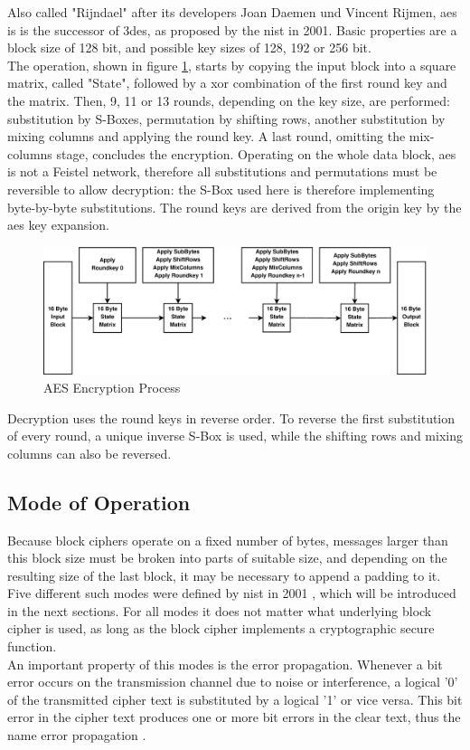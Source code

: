 Also called "Rijndael" after its developers Joan Daemen und Vincent Rijmen, \gls{aes} is is the successor of \gls{3des}, as
proposed by the \gls{nist} in 2001. Basic properties are a block size of 128 bit, and possible key sizes
of 128, 192 or 256 bit.
\\
The operation, shown in figure \ref{fig:aesEnc}, starts by copying the input block into a square matrix, called "State",
followed by a \gls{xor} combination of the first round 
key and the matrix. Then, 9, 11 or 13 rounds, depending on the key size, are performed: substitution by S-Boxes, permutation by shifting rows, 
another substitution by mixing columns and applying the round key. A last round, omitting the mix-columns stage, concludes the encryption.
Operating on the whole data block, \gls{aes} is not a Feistel network, therefore all substitutions and permutations must be reversible to allow decryption: 
the S-Box used here is therefore implementing byte-by-byte substitutions. The round keys are derived from the origin key by the \gls{aes} key expansion.
\begin{figure}
    \centering
    \includegraphics[width=1\textwidth]{figures/aesEnc.eps}
    \caption{AES Encryption Process}
    \label{fig:aesEnc}
\end{figure}
Decryption uses the round keys in reverse order. To reverse the first substitution of every round, a unique inverse S-Box is used, while the shifting rows
and mixing columns can also be reversed.

\subsection{Mode of Operation}\label{confidentiality}

Because block ciphers  operate on a fixed number of bytes, messages larger than this block size must be broken into parts of suitable size, and depending on 
the resulting size of the last block, it may be necessary to append a padding to it. Five different such modes were defined by \gls{nist} in 2001 \cite{moo},
which will be introduced in the next sections. For all modes it does not matter what underlying block cipher is used, as long as the block cipher implements
a cryptographic secure function. 
\\
An important property of this modes is the error propagation.
Whenever a bit error occurs on the transmission channel due to noise or interference,
a logical '0' of the transmitted cipher text is substituted by a logical '1' or vice versa. This bit error in the cipher text produces one or more bit errors
in the clear text, thus the name error propagation \cite{burda}.

